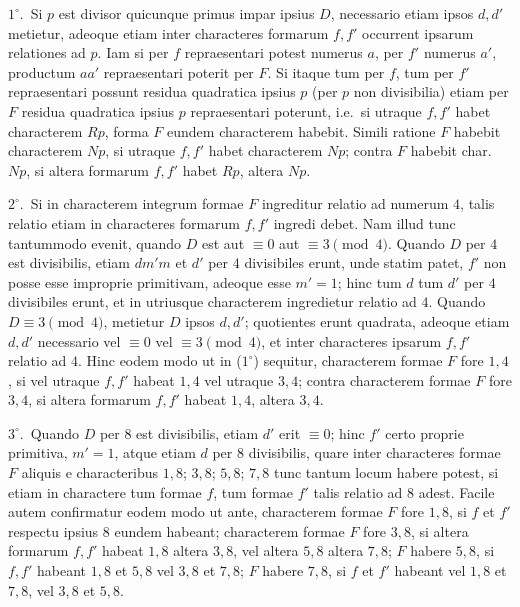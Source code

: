\documentclass[12pt,a4paper]{article}
\theoremstyle{plain}
\theoremstyle{definition}
\theoremstyle{remark}
\begin{document}
$1^{\circ}$.\ Si $p$ est divisor quicunque primus impar ipsius $D$, necessario etiam ipsos $d, d'$ metietur, adeoque etiam inter characteres formarum $f, f'$ occurrent ipsarum relationes ad $p$. Iam si per $f$ repraesentari potest numerus $a$, per $f'$ numerus $a'$, productum $aa'$ repraesentari poterit per $F$. Si itaque tum per $f$, tum per $f'$ repraesentari possunt residua quadratica ipsius $p$ (per $p$ non divisibilia) etiam per $F$ residua quadratica ipsius $p$ repraesentari poterunt, i.e.\ si utraque $f, f'$ habet characterem $Rp$, forma $F$ eundem characterem habebit. Simili ratione $F$ habebit characterem $Np$, si utraque $f, f'$ habet characterem $Np$; contra $F$ habebit char.\ $Np$, si altera formarum $f, f'$ habet $Rp$, altera $Np$.

$2^{\circ}$.\ Si in characterem integrum formae $F$ ingreditur relatio ad numerum $4$, talis relatio etiam in characteres formarum $f, f'$ ingredi debet. Nam illud tunc tantummodo evenit, quando $D$ est aut $\equiv 0$ aut $\equiv 3 \pmod{4}$. Quando $D$ per $4$ est divisibilis, etiam $dm'm$ et $d'$ per $4$ divisibiles erunt, unde statim patet, $f'$ non posse esse improprie primitivam, adeoque esse $m' = 1$; hinc tum $d$ tum $d'$ per $4$ divisibiles erunt, et in utriusque characterem ingredietur relatio ad $4$. Quando $D \equiv 3 \pmod{4}$, metietur $D$ ipsos $d, d'$; quotientes erunt quadrata, adeoque etiam $d, d'$ necessario vel $\equiv 0$ vel $\equiv 3 \pmod{4}$, et inter characteres ipsarum $f, f'$ relatio ad $4$. Hinc eodem modo ut in ($1^{\circ}$) sequitur, characterem formae $F$ fore $1,4$, si vel utraque $f, f'$ habeat $1,4$ vel utraque $3,4$; contra characterem formae $F$ fore $3,4$, si altera formarum $f, f'$ habeat $1,4$, altera $3,4$.

$3^{\circ}$.\ Quando $D$ per $8$ est divisibilis, etiam $d'$ erit $\equiv 0$; hinc $f'$ certo proprie primitiva, $m' = 1$, atque etiam $d$ per $8$ divisibilis, quare inter characteres formae $F$ aliquis e characteribus $1,8$; $3,8$; $5,8$; $7,8$ tunc tantum locum habere potest, si etiam in charactere tum formae $f$, tum formae $f'$ talis relatio ad $8$ adest. Facile autem confirmatur eodem modo ut ante, characterem formae $F$ fore $1,8$, si $f$ et $f'$ respectu ipsius $8$ eundem habeant; characterem formae $F$ fore $3,8$, si altera formarum $f, f'$ habeat $1,8$ altera $3,8$, vel altera $5,8$ altera $7,8$; $F$ habere $5,8$, si $f, f'$ habeant $1,8$ et $5,8$ vel $3,8$ et $7,8$; $F$ habere $7,8$, si $f$ et $f'$ habeant vel $1,8$ et $7,8$, vel $3,8$ et $5,8$.
\end{document}
